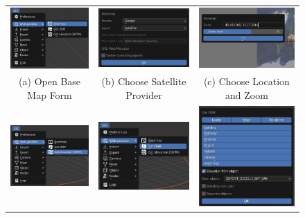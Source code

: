 \begin{figure}[H]
\begin{tabular}{ccc}

\includegraphics[width=43mm]{src/img/manual-download/1-get-basemap.jpg} &
\includegraphics[width=43mm]{src/img/manual-download/2-choose-sat.jpg} &
\includegraphics[width=43mm]{src/img/manual-download/3-choose-gps-zoom.jpg} \\
  (a) Open Base Map Form &  
  (b) Choose Satellite Provider &   
  (c) Choose Location and Zoom \\
  \includegraphics[width=43mm]{src/img/manual-download/4-get-alt.jpg} &
  \includegraphics[width=43mm]{src/img/manual-download/5-get-osm.jpg} &
  \includegraphics[width=43mm]{src/img/manual-download/6-osm-settings.jpg} \\

\end{tabular}
\end{figure}
